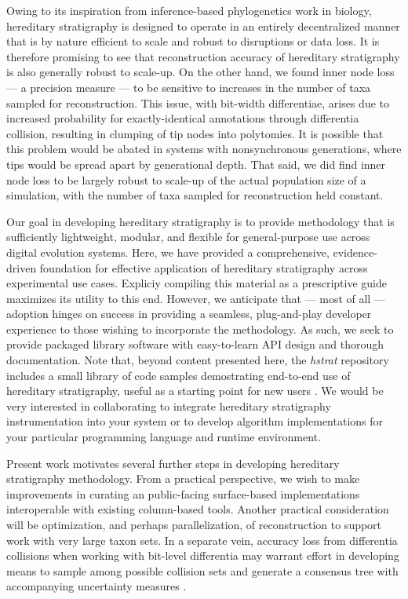 Owing to its inspiration from inference-based phylogenetics work in biology, hereditary stratigraphy is designed to operate in an entirely decentralized manner that is by nature efficient to scale and robust to disruptions or data loss.
It is therefore promising to see that reconstruction accuracy of hereditary stratigraphy is also generally robust to scale-up.
On the other hand, we found inner node loss --- a precision measure --- to be sensitive to increases in the number of taxa sampled for reconstruction.
This issue, with bit-width differentiae, arises due to increased probability for exactly-identical annotations through differentia collision, resulting in clumping of tip nodes into polytomies.
It is possible that this problem would be abated in systems with nonsynchronous generations, where tips would be spread apart by generational depth.
That said, we did find inner node loss to be largely robust to scale-up of the actual population size of a simulation, with the number of taxa sampled for reconstruction held constant.

Our goal in developing hereditary stratigraphy is to provide methodology that is sufficiently lightweight, modular, and flexible for general-purpose use across digital evolution systems.
Here, we have provided a comprehensive, evidence-driven foundation for effective application of hereditary stratigraphy across experimental use cases.
Expliciy compiling this material as a prescriptive guide maximizes its utility to this end.
However, we anticipate that --- most of all --- adoption hinges on success in providing a seamless, plug-and-play developer experience to those wishing to incorporate the methodology.
As such, we seek to provide packaged library software with easy-to-learn API design and thorough documentation.
Note that, beyond content presented here, the \textit{hstrat} repository includes a small library of code samples demostrating end-to-end use of hereditary stratigraphy, useful as a starting point for new users \citep{moreno2022hstrat}.
We would be very interested in collaborating to integrate hereditary stratigraphy instrumentation into your system or to develop algorithm implementations for your particular programming language and runtime environment.

Present work motivates several further steps in developing hereditary stratigraphy methodology.
From a practical perspective, we wish to make improvements in curating an  public-facing surface-based implementations interoperable with existing column-based tools.
Another practical consideration will be optimization, and perhaps parallelization, of reconstruction to support work with very large taxon sets.
In a separate vein, accuracy loss from differentia collisions when working with bit-level differentia may warrant effort in developing means to sample among possible collision sets and generate a consensus tree with accompanying uncertainty measures \citep{TODO}.

